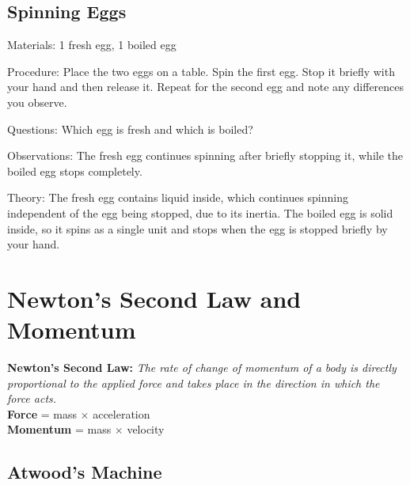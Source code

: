 \begin{multicols}{2}
\subsection{Spinning Eggs}


\begin{description*}
\item[Materials:]{1 fresh egg, 1 boiled egg}
\item[Procedure:]{Place the two eggs on a table. Spin the first egg. Stop it briefly with your hand and then release it. Repeat for the second egg and note any differences you observe.}
\item[Questions:]{Which egg is fresh and which is boiled?}
\item[Observations:]{The fresh egg continues spinning after briefly stopping it, while the boiled egg stops completely.}
\item[Theory:]{The fresh egg contains liquid inside, which continues spinning independent of the egg being stopped, due to its inertia. The boiled egg is solid inside, so it spins as a single unit and stops when the egg is stopped briefly by your hand.}
\end{description*}


\section*{Newton's Second Law and Momentum}  
\textbf{Newton's Second Law:} \emph{The rate of change of momentum of a body is directly proportional to the applied force and takes place in the direction in which the force acts.}\\
\textbf{Force} = mass $\times$ acceleration\\
\textbf{Momentum} = mass $\times$ velocity

\subsection{Atwood's Machine}


\end{multicols}
